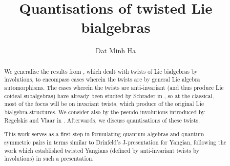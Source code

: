 

\setcounter{section}{-1}


\renewcommand{\simpleroots}{\mathbb{I}}



	\title{Quantisations of twisted Lie bialgebras}
	
	\author{Dat Minh Ha}
	\maketitle
	
	\begin{abstract}
	    We generalise the results from \cite{belliard_crampe_coideal_subalgebras_from_twisted_manin_triples}, which dealt with twists of Lie bialgebras by involutions, to encompass cases wherein the twists are by general Lie algebra automorphisms. The cases wherein the twists are anti-invariant (and thus produce Lie coideal subalgebras) have already been studied by Schrader in \cite{schrader_integrable_systems_from_classical_reflection_equations}, so at the classical, most of the focus will be on invariant twists, which produce  of the original Lie bialgebra structures. We consider also  by the pseudo-involutions introduced by Regelskis and Vlaar in \cite{regelskis_vlaar_kac_moody_pseudo_symmetric_pairs}. Afterwards, we discuss quantisations of these twists.
        
        This work serves as a first step in formulating quantum algebras and quantum symmetric pairs in terms similar to Drinfeld's J-presentation for Yangian, following the work \cite{belliard_regelskis_J_presentation_for_twisted_yangians} which established twisted Yangians (defined by anti-invariant twists by involutions) in such a presentation.
	\end{abstract}
	
	{
      \hypersetup{} 
      \tableofcontents %
    }

    \listoftodos

    

    

    

    

